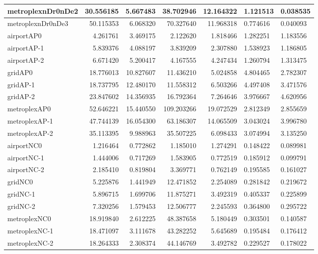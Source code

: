 \begin{longtable}{|l|r|r|r|r|}
metroplexnDr0nDe2 & 30.556185 & 5.667483 & 38.702946 & 12.164322 & 1.121513 & 0.038535 \\ \hline
metroplexnDr0nDe3 & 50.115353 & 6.068320 & 70.327640 & 11.968318 & 0.774616 & 0.040093 \\ \hline
airportAP0 & 4.261761 & 3.469175 & 2.122620 & 1.818466 & 1.282251 & 1.183556 \\ \hline
airportAP-1 & 5.839376 & 4.088197 & 3.839209 & 2.307880 & 1.538923 & 1.186805 \\ \hline
airportAP-2 & 6.671420 & 5.200417 & 4.167555 & 4.247434 & 1.260794 & 1.313475 \\ \hline
gridAP0 & 18.776013 & 10.827607 & 11.436210 & 5.024858 & 4.804465 & 2.782307 \\ \hline
gridAP-1 & 18.737795 & 12.480170 & 11.558312 & 6.503266 & 4.497408 & 3.471576 \\ \hline
gridAP-2 & 23.847602 & 14.356935 & 16.792364 & 7.264646 & 3.976667 & 4.620956 \\ \hline
metroplexAP0 & 52.646221 & 15.440550 & 109.203266 & 19.072529 & 2.812349 & 2.855659 \\ \hline
metroplexAP-1 & 47.744139 & 16.054300 & 63.186307 & 14.065509 & 3.043024 & 3.996780 \\ \hline
metroplexAP-2 & 35.113395 & 9.988963 & 35.507225 & 6.098433 & 3.074994 & 3.135250 \\ \hline
airportNC0 & 1.216464 & 0.772862 & 1.185010 & 1.274291 & 0.148422 & 0.089981 \\ \hline
airportNC-1 & 1.444006 & 0.717269 & 1.583905 & 0.772519 & 0.185912 & 0.099791 \\ \hline
airportNC-2 & 2.185410 & 0.819804 & 3.369771 & 0.762149 & 0.195585 & 0.161027 \\ \hline
gridNC0 & 5.225876 & 1.441949 & 12.471852 & 2.254089 & 0.281842 & 0.219672 \\ \hline
gridNC-1 & 5.896715 & 1.699706 & 11.875271 & 3.492319 & 0.405337 & 0.225899 \\ \hline
gridNC-2 & 7.320256 & 1.579453 & 12.506777 & 2.245593 & 0.364800 & 0.295722 \\ \hline
metroplexNC0 & 18.919840 & 2.612225 & 48.387658 & 5.180449 & 0.303501 & 0.140587 \\ \hline
metroplexNC-1 & 18.471097 & 3.111678 & 43.282252 & 5.645689 & 0.195484 & 0.176412 \\ \hline
metroplexNC-2 & 18.264333 & 2.308374 & 44.146769 & 3.492782 & 0.229527 & 0.178022 \\ \hline
\end{longtable}
